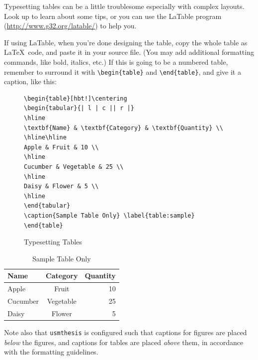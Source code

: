 Typesetting tables can be a little troublesome especially with complex layouts.  Look up \citep{roberts} to learn about some tips, or you can use the \textrm{LaTable} program (\url{http://www.g32.org/latable/}) to help you.

If using \textrm{LaTable}, when you're done designing the table, copy the whole table as \LaTeX\ code, and paste it in your source file.  (You may add additional formatting commands, like bold, italics, etc.)  If this is going to be a numbered table, remember to surround it with \verb|\begin{table}| and \verb|\end{table}|, and give it a caption, like this:

\begin{figure}[hbt!]
\begin{lstlisting}
\begin{table}[hbt!]\centering
\begin{tabular}{| l | c || r |}
\hline
\textbf{Name} & \textbf{Category} & \textbf{Quantity} \\
\hline\hline
Apple & Fruit & 10 \\
\hline
Cucumber & Vegetable & 25 \\
\hline
Daisy & Flower & 5 \\
\hline
\end{tabular}
\caption{Sample Table Only} \label{table:sample}
\end{table}
\end{lstlisting}
\caption{Typesetting Tables}\label{fig:lst:table}
\end{figure}

\begin{table}[hbt!]\centering
\begin{tabular}{| l | c || r |}
\hline
\textbf{Name} & \textbf{Category} & \textbf{Quantity} \\
\hline\hline
Apple & Fruit & 10 \\
\hline
Cucumber & Vegetable & 25 \\
\hline
Daisy & Flower & 5 \\
\hline
\end{tabular}
\caption{Sample Table Only} \label{table:sample}
\end{table}

Note also that \verb|usmthesis| is configured such that captions for figures are placed \emph{below} the figures, and captions for tables are placed \emph{above} them, in accordance with the formatting guidelines.


